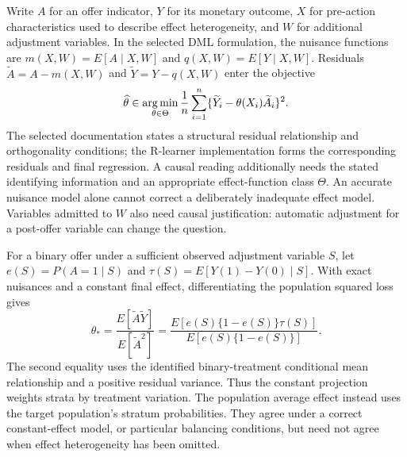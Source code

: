 Write $A$ for an offer indicator, $Y$ for its monetary outcome, $X$ for
pre-action characteristics used to describe effect heterogeneity, and $W$ for
additional adjustment variables. In the selected DML formulation, the nuisance
functions are $m(X,W)=E[A\mid X,W]$ and $q(X,W)=E[Y\mid X,W]$.
Residuals $\widetilde A=A-m(X,W)$ and
$\widetilde Y=Y-q(X,W)$ enter the objective
\begin{equation}
 \widehat\theta\in\mathop{\rm arg\,min}_{\theta\in\Theta}
 \frac{1}{n}\sum_{i=1}^n
 \{\widetilde Y_i-\theta(X_i)\widetilde A_i\}^{2}.
 \label{exec19:econml-objective}
\end{equation}
The selected documentation states a structural residual relationship and
orthogonality conditions; the R-learner implementation forms the corresponding
residuals and final regression. A causal reading additionally needs the stated
identifying information and an appropriate effect-function class $\Theta$.
An accurate nuisance model alone cannot correct a deliberately inadequate
effect model. Variables admitted to $W$ also need causal justification:
automatic adjustment for a post-offer variable can change the question.
\citep{exec19_econml_source}

For a binary offer under a sufficient observed adjustment variable $S$, let
$e(S)=P(A=1\mid S)$ and $\tau(S)=E[Y(1)-Y(0)\mid S]$. With exact
nuisances and a constant final effect, differentiating the population squared
loss gives
\begin{equation}
 \theta_*=
 \frac{E[\widetilde A\widetilde Y]}{E[\widetilde A^2]}
 =\frac{E[e(S)\{1-e(S)\}\tau(S)]}
        {E[e(S)\{1-e(S)\}]}.
 \label{exec19:econml-projection}
\end{equation}
The second equality uses the identified binary-treatment conditional mean
relationship and a positive residual variance. Thus the constant projection
weights strata by treatment variation. The population average effect instead
uses the target population's stratum probabilities. They agree under a
correct constant-effect model, or particular balancing conditions, but need
not agree when effect heterogeneity has been omitted.
\citep{exec19_econml_reference}

